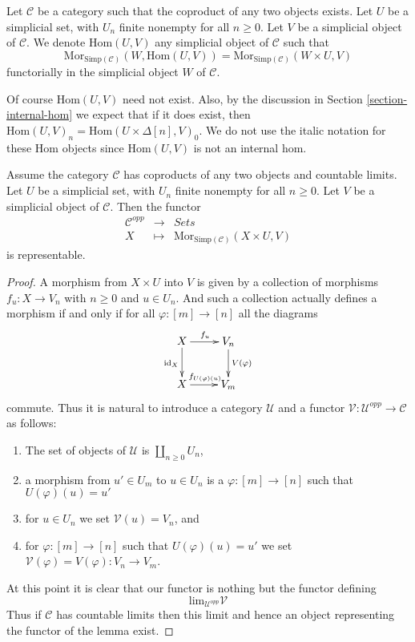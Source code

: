 \begin{definition}
\label{definition-hom-from-simplicial-set}
Let $\mathcal{C}$ be a category such that the coproduct
of any two objects exists.
Let $U$ be a simplicial set, with $U_n$ finite nonempty
for all $n \geq 0$.
Let $V$ be a simplicial object of $\mathcal{C}$.
We denote $\text{Hom}(U, V)$ any simplicial object of
$\mathcal{C}$ such that
$$
\text{Mor}_{\text{Simp}(\mathcal{C})}(W, \text{Hom}(U, V))
=
\text{Mor}_{\text{Simp}(\mathcal{C})}(W \times U, V)
$$
functorially in the simplicial object $W$ of $\mathcal{C}$.
\end{definition}

\noindent
Of course $\text{Hom}(U, V)$ need not exist.
Also, by the discussion in Section \ref{section-internal-hom}
we expect that if it does exist, then
$\text{Hom}(U, V)_n = \text{Hom}(U \times \Delta[n], V)_0$.
We do not use the italic notation for these Hom objects
since $\text{Hom}(U, V)$ is not an internal hom.

\begin{lemma}
\label{lemma-exists-hom-0-from-simplicial-set}
Assume the category $\mathcal{C}$
has coproducts of any two objects and countable
limits. Let $U$ be a simplicial set, with $U_n$ finite nonempty
for all $n \geq 0$.
Let $V$ be a simplicial object of $\mathcal{C}$.
Then the functor
\begin{eqnarray*}
\mathcal{C}^{opp} & \longrightarrow & \textit{Sets} \\
X
& \longmapsto &
\text{Mor}_{\text{Simp}(\mathcal{C})}(X \times U, V)
\end{eqnarray*}
is representable.
\end{lemma}

\begin{proof}
A morphism from $X \times U$ into $V$ is given by a collection
of morphisms $f_u : X \to V_n$ with $n \geq 0$ and $u \in U_n$.
And such a collection actually defines a morphism if and only
if for all $\varphi : [m] \to [n]$ all the diagrams
$$
\xymatrix{
X \ar[r]^{f_u} \ar[d]_{\text{id}_X} & V_n \ar[d]^{V(\varphi)} \\
X \ar[r]^{f_{U(\varphi)(u)}} & V_m 
}
$$
commute. Thus it is natural to introduce a category
$\mathcal{U}$ and a functor
$\mathcal{V} : \mathcal{U}^{opp} \to \mathcal{C}$
as follows:
\begin{enumerate}
\item The set of objects of $\mathcal{U}$ is
$\coprod_{n \geq 0} U_n$,
\item a morphism from $u' \in U_m$ to $u \in U_n$
is a $\varphi : [m] \to [n]$ such that $U(\varphi)(u) = u'$
\item for $u \in U_n$ we set $\mathcal{V}(u) = V_n$, and
\item for $\varphi : [m] \to [n]$ such that $U(\varphi)(u) = u'$
we set $\mathcal{V}(\varphi) = V(\varphi) : V_n \to V_m$.
\end{enumerate}
At this point it is clear that our functor is nothing but the
functor defining
$$
\text{lim}_{\mathcal{U}^{opp}} \mathcal{V}
$$
Thus if $\mathcal{C}$ has countable limits then this limit
and hence an object representing the functor of the lemma
exist.
\end{proof}

